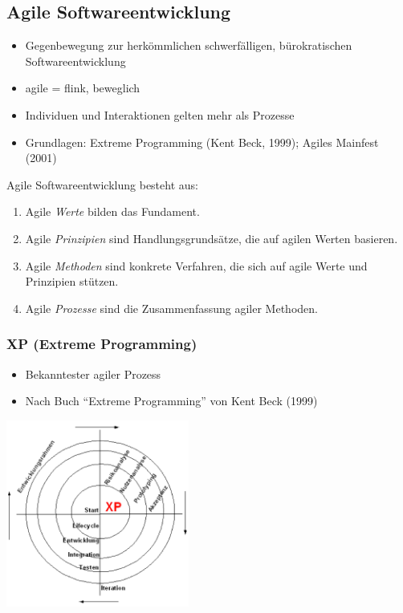 \subsection{Agile Softwareentwicklung}
\begin{itemize}
	\item Gegenbewegung zur herkömmlichen schwerfälligen, bürokratischen Softwareentwicklung
	\item agile = flink, beweglich
	\item Individuen und Interaktionen gelten mehr als Prozesse
	\item Grundlagen: Extreme Programming (Kent Beck, 1999); Agiles Mainfest (2001)
\end{itemize}

Agile Softwareentwicklung besteht aus:
\begin{enumerate}
	\item Agile \textit{Werte} bilden das Fundament.
	\item Agile \textit{Prinzipien} sind Handlungsgrundsätze, die auf agilen Werten basieren.
	\item Agile \textit{Methoden} sind konkrete Verfahren, die sich auf agile Werte und Prinzipien stützen.
	\item Agile \textit{Prozesse} sind die Zusammenfassung agiler Methoden. 
\end{enumerate}

\subsubsection{XP (Extreme Programming)}
\begin{minipage}{12cm}
	\begin{itemize}
		\item Bekanntester agiler Prozess
		\item Nach Buch ``Extreme Programming'' von Kent Beck (1999)
	\end{itemize}
\end{minipage}
\begin{minipage}{6cm}
	\includegraphics[width=6cm]{images/extreme_programming.png}
\end{minipage}


